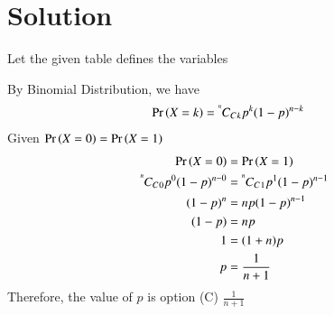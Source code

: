 \section*{Solution}
Let the given table defines the variables
\begin{table}[h]
    \centering
    \caption{Definition of Variables}
    \label{ma2010-2:table:1}
\end{table}
By Binomial Distribution, we have
\begin{align}
    \Pr\left(X=k\right) &= {{}^{^n}\mkern-1muC_{C}}{_k} p^k (1-p)^{n-k}
\end{align}
Given $\Pr\left(X=0\right)=\Pr\left(X=1\right)$
\begin{align}
    \Pr\left(X=0\right) &= \Pr\left(X=1\right) \\
    {{}^{^n}\mkern-1muC_{C}}{_0} p^0 (1-p)^{n-0} &= {{}^{^n}\mkern-1muC_{C}}{_1} p^1 (1-p)^{n-1} \\
    (1-p)^{n} &= n p (1-p)^{n-1} \\
    (1-p) &= n p \\
    1 &= (1+n) p \\
    p &= \frac{1}{n+1}
\end{align}
Therefore, the value of $p$ is option (C) $\frac{1}{n+1}$